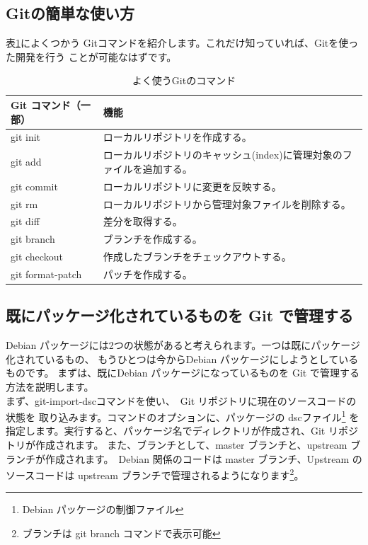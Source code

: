 \documentclass[mingoth,a4paper]{jsarticle}
\begin{document}
\subsection{Gitの簡単な使い方}
表\ref{git-command}によくつかう Gitコマンドを紹介します。これだけ知っていれば、Gitを使った開発を行う
ことが可能なはずです。
   \begin{table}[h]
    \begin{center}
      {
        \begin{tabular}{l|l} \hline
                Git コマンド（一部） & 機能 \\ \hline \hline
git init & ローカルリポジトリを作成する。\\
git add & ローカルリポジトリのキャッシュ(index)に管理対象のファイルを追加する。\\
git commit & ローカルリポジトリに変更を反映する。\\
git rm & ローカルリポジトリから管理対象ファイルを削除する。\\
git diff & 差分を取得する。\\
git branch & ブランチを作成する。\\
git checkout & 作成したブランチをチェックアウトする。\\
git format-patch & パッチを作成する。\\
           \end{tabular}
        }
     \caption{よく使うGitのコマンド}
     \label{git-command}
    \end{center}
    \end{table}

\subsection{既にパッケージ化されているものを Git で管理する}
Debian パッケージには2つの状態があると考えられます。一つは既にパッケージ化されているもの、
もうひとつは今からDebian パッケージにしようとしているものです。
まずは、既にDebian パッケージになっているものを Git で管理する方法を説明します。
\\

まず、git-import-dscコマンドを使い、　Git リポジトリに現在のソースコードの状態を
取り込みます。コマンドのオプションに、パッケージの dscファイル\footnote{Debian パッケージの制御ファイル}
を指定します。実行すると、パッケージ名でディレクトリが作成され、Git リポジトリが作成されます。
また、ブランチとして、master ブランチと、upstream ブランチが作成されます。　Debian 関係のコードは
 master 
ブランチ、Upstream のソースコードは upstream ブランチで管理されるようになります\footnote{ブランチは git branch コマンドで表示可能}。
\end{document}
